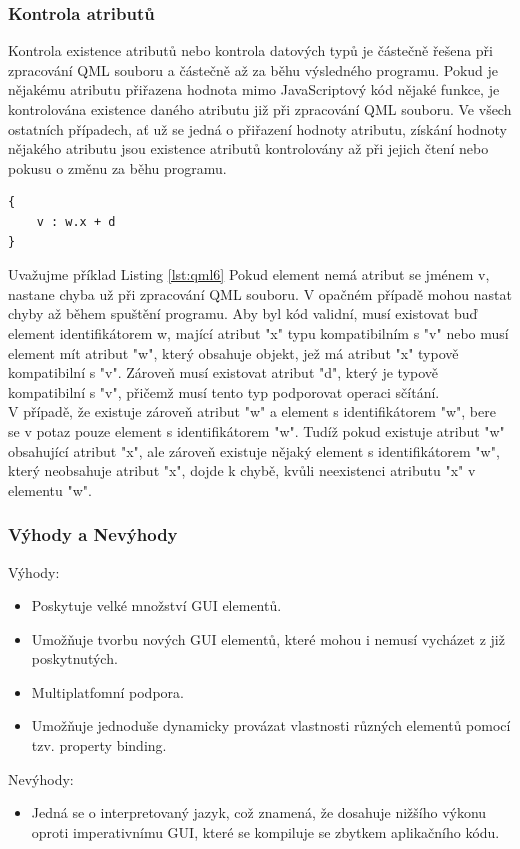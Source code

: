\documentclass[report,11pt]{elsarticle}
\begin{document}
\subsubsection{Kontrola atributů}
Kontrola existence atributů nebo kontrola datových typů je částečně řešena při zpracování QML souboru a částečně až za běhu výsledného programu. Pokud je nějakému atributu přiřazena hodnota mimo JavaScriptový kód nějaké funkce, je kontrolována existence daného atributu již při zpracování QML souboru. Ve všech ostatních případech, ať už se jedná o přiřazení hodnoty atributu, získání hodnoty nějakého atributu jsou existence atributů kontrolovány až při jejich čtení nebo pokusu o změnu za běhu programu.
\begin{lstlisting}[frame=single,caption=Ukázka použití komponenty z jiného souboru.,label=lst:qml6]
{
	v : w.x + d
}
\end{lstlisting}
Uvažujme příklad Listing \ref{lst:qml6} Pokud element nemá atribut se jménem v, nastane chyba už při zpracování QML souboru. V opačném případě mohou nastat chyby až během spuštění programu. Aby byl kód validní, musí existovat buď element identifikátorem w, mající atribut "x" typu kompatibilním s "v" nebo musí element mít atribut "w", který obsahuje objekt, jež má atribut "x" typově kompatibilní s "v". Zároveň musí existovat atribut "d", který je typově kompatibilní s "v", přičemž musí tento typ podporovat operaci sčítání.\\
V případě, že existuje zároveň atribut "w" a element s identifikátorem "w", bere se v potaz pouze element s identifikátorem "w". Tudíž pokud existuje atribut "w" obsahující atribut "x", ale zároveň existuje nějaký element s identifikátorem "w", který neobsahuje atribut "x", dojde k chybě, kvůli neexistenci atributu "x" v elementu "w". 

\subsubsection{Výhody a Nevýhody}
Výhody:
\begin{itemize}
  \item Poskytuje velké množství GUI elementů.
  \item Umožňuje tvorbu nových GUI elementů, které mohou i nemusí vycházet z již poskytnutých.
  \item Multiplatfomní podpora.
  \item Umožňuje jednoduše dynamicky provázat vlastnosti různých elementů pomocí tzv. property binding.
\end{itemize}
Nevýhody:
\begin{itemize}
  \item Jedná se o interpretovaný jazyk, což znamená, že dosahuje nižšího výkonu oproti imperativnímu GUI, které se kompiluje se zbytkem aplikačního kódu.
\end{itemize}
\end{document}
